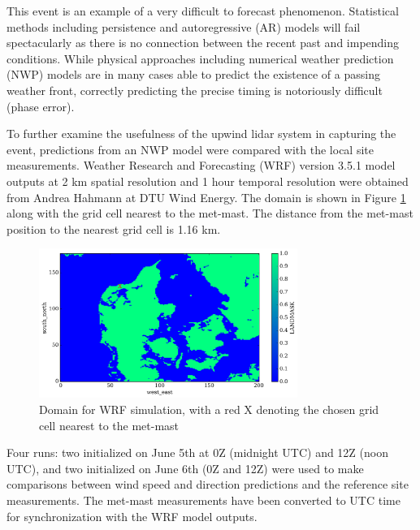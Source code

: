 This event is an example of a very difficult to forecast phenomenon. Statistical methods including persistence and autoregressive (AR) models will fail spectacularly as there is no connection between the recent past and impending conditions. While physical approaches including numerical weather prediction (NWP) models are in many cases able to predict the existence of a passing weather front, correctly predicting the precise timing is notoriously difficult (phase error).

To further examine the usefulness of the upwind lidar system in capturing the event, predictions from an NWP model were compared with the local site measurements. 
Weather Research and Forecasting (WRF) version 3.5.1 model outputs at 2 km spatial resolution and 1 hour temporal resolution were obtained from Andrea Hahmann at DTU Wind Energy. The domain is shown in Figure \ref{fig:wrf_grid_annotated} along with the grid cell nearest to the met-mast. The distance from the met-mast position to the nearest grid cell is 1.16 km.

\begin{figure}[htbp]
    \centering
        \includegraphics[width=0.75\textwidth]{graphics/results/balcony-addendum/wrf_grid_annotated.png}
    \caption{Domain for WRF simulation, with a red X denoting the chosen grid cell nearest to the met-mast}
    \label{fig:wrf_grid_annotated}
\end{figure}

Four runs: two initialized on June 5th at 0Z (midnight UTC) and 12Z (noon UTC), and two initialized on June 6th (0Z and 12Z) were used to make comparisons between wind speed and direction predictions and the reference site measurements. The met-mast measurements have been converted to UTC time for synchronization with the WRF model outputs.

